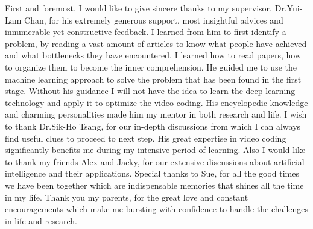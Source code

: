 \documentclass{report}
\begin{document}
    First and foremost, I would like to give sincere thanks to my supervisor,
    Dr.Yui-Lam Chan, for his
    extremely generous support, most insightful advices and innumerable yet
    constructive feedback.
    I learned from him to first identify a problem,
    by reading a vast amount of articles
    to know what people have achieved and what bottlenecks they have encountered.
    I learned how to read papers, how to organize them to
    become the inner comprehension.
    He guided me to use the machine learning approach to solve the
    problem that has been found in the first stage.
    Without his guidance I will not have the idea to learn the deep
    learning technology and apply it to optimize the video coding.
    His encyclopedic knowledge and charming personalities made him my mentor in
    both research and life.
    I wish to thank Dr.Sik-Ho Tsang, for our in-depth discussions from
    which I can always find useful clues to proceed to next step.
    His great expertise in video coding significantly benefits me during my
    intensive period of learning.
    Also I would like to thank my friends Alex
    and Jacky, for our
    extensive discussions about artificial intelligence
    and their applications.
    Special thanks to Sue, for all the good times
    we have been together which are indispensable
    memories that shines all the time in my life.
    Thank you my parents, for the great love and constant
    encouragements which make me bursting with confidence 
    to handle the challenges in life and research.
    \afterpreface
    
    
    
    
    
    
    \printbibliography[heading=bibintoc]
\end{document}
